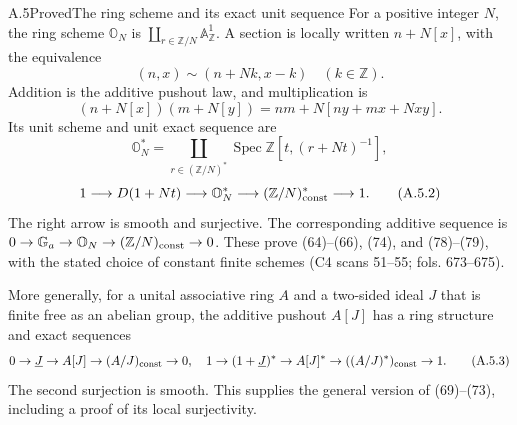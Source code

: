 \begin{statement}{A.5}{Proved}{The ring scheme and its exact unit sequence}
For a positive integer $N$, the ring scheme $\mathbb O_N$ is
$\coprod_{r\in\mathbb Z/N}\mathbb A^1_{\mathbb Z}$. A section is locally
written $n+N[x]$, with the equivalence
\[
 (n,x)\sim(n+Nk,x-k)\quad(k\in\mathbb Z).
\]
Addition is the additive pushout law, and multiplication is
\[
 (n+N[x])(m+N[y])=nm+N[ny+mx+Nxy].                    \tag{A.5.1}
\]
Its unit scheme and unit exact sequence are
\[
 \mathbb O_N^*=\coprod_{r\in(\mathbb Z/N)^*}
 \operatorname{Spec}\mathbb Z[t,(r+Nt)^{-1}],
\]
\[
 1\longrightarrow D(1+Nt)\longrightarrow\mathbb O_N^*
 \longrightarrow(\mathbb Z/N)^*_{\rm const}\longrightarrow1. \tag{A.5.2}
\]
The right arrow is smooth and surjective. The corresponding additive
sequence is $0\to\mathbb G_a\to\mathbb O_N\to(\mathbb Z/N)_{\rm const}
\to0$. These prove (64)--(66), (74), and (78)--(79), with the stated
choice of constant finite schemes (C4 scans 51--55; fols. 673--675).

More generally, for a unital associative ring $A$ and a two-sided
ideal $J$ that is finite free as an abelian group, the additive pushout
$A[J]$ has a ring structure and exact sequences
\[
 0\to\underline J\to A[J]\to(A/J)_{\rm const}\to0,
 \quad
 1\to(1+\underline J)^*\to A[J]^*
       \to((A/J)^*)_{\rm const}\to1.                  \tag{A.5.3}
\]
The second surjection is smooth. This supplies the general version of
(69)--(73), including a proof of its local surjectivity.
\end{statement}
